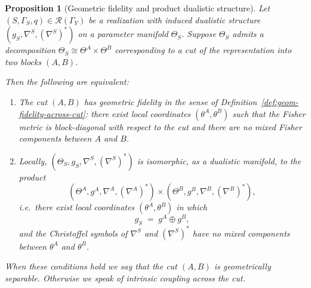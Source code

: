 \documentclass[11pt]{article}
\newtheorem{proposition}{Proposition}
\newcommand{\Rcal}{\mathcal{R}}
\begin{document}
\begin{proposition}[Geometric fidelity and product dualistic structure]
\label{prop:geom-fidelity-product}
Let $(S,\Gamma_S,q)\in\Rcal(\Gamma_Y)$ be a realization with induced
dualistic structure $(g_S,\nabla^S,(\nabla^S)^\ast)$ on a parameter
manifold $\Theta_S$. Suppose $\Theta_S$ admits a decomposition
$\Theta_S \cong \Theta^A \times \Theta^B$ corresponding to a cut of the
representation into two blocks $(A,B)$.

Then the following are equivalent:
\begin{enumerate}[label=(G\arabic*),leftmargin=1.8em]
  \item The cut $(A,B)$ has geometric fidelity in the sense of
  Definition~\ref{def:geom-fidelity-across-cut}: there exist local
  coordinates $(\theta^A,\theta^B)$ such that the Fisher metric is
  block-diagonal with respect to the cut and there are no mixed Fisher
  components between $A$ and $B$.
  \item Locally, $(\Theta_S,g_S,\nabla^S,(\nabla^S)^\ast)$ is
  isomorphic, as a dualistic manifold, to the product
  \[
    (\Theta^A,g^A,\nabla^A,(\nabla^A)^\ast)
    \times
    (\Theta^B,g^B,\nabla^B,(\nabla^B)^\ast),
  \]
  i.e.\ there exist local coordinates $(\theta^A,\theta^B)$ in which
  \[
    g_S \;=\; g^A \oplus g^B,
  \]
  and the Christoffel symbols of $\nabla^S$ and $(\nabla^S)^\ast$ have
  no mixed components between $\theta^A$ and $\theta^B$.
\end{enumerate}

When these conditions hold we say that the cut $(A,B)$ is
\emph{geometrically separable}. Otherwise we speak of intrinsic
coupling across the cut.
\end{proposition}
\end{document}
